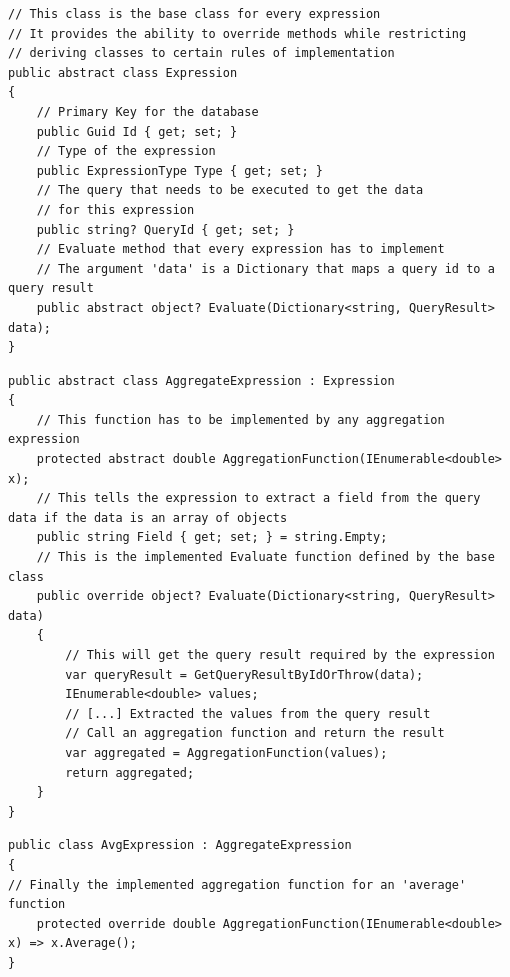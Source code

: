 \newpage

\begin{lstlisting}[style=csharp, caption=Expression base class, label=lst:expression-base]
// This class is the base class for every expression
// It provides the ability to override methods while restricting 
// deriving classes to certain rules of implementation
public abstract class Expression
{
    // Primary Key for the database 
    public Guid Id { get; set; }
    // Type of the expression
    public ExpressionType Type { get; set; }
    // The query that needs to be executed to get the data
    // for this expression
    public string? QueryId { get; set; }
    // Evaluate method that every expression has to implement
    // The argument 'data' is a Dictionary that maps a query id to a query result
    public abstract object? Evaluate(Dictionary<string, QueryResult> data);
}
\end{lstlisting}


\begin{lstlisting}[style=csharp, caption=Expression base class, label=lst:expression-aggregation] 
public abstract class AggregateExpression : Expression
{
    // This function has to be implemented by any aggregation expression
    protected abstract double AggregationFunction(IEnumerable<double> x);
    // This tells the expression to extract a field from the query data if the data is an array of objects 
    public string Field { get; set; } = string.Empty;
    // This is the implemented Evaluate function defined by the base class
    public override object? Evaluate(Dictionary<string, QueryResult> data)
    {
        // This will get the query result required by the expression
        var queryResult = GetQueryResultByIdOrThrow(data);
        IEnumerable<double> values;
        // [...] Extracted the values from the query result
        // Call an aggregation function and return the result
        var aggregated = AggregationFunction(values);
        return aggregated;
    }
}
\end{lstlisting}


\begin{lstlisting}[style=csharp, caption=Expression average class, label=lst:expression-average]
public class AvgExpression : AggregateExpression
{
// Finally the implemented aggregation function for an 'average' function
    protected override double AggregationFunction(IEnumerable<double> x) => x.Average();
}
\end{lstlisting}

\newpage

